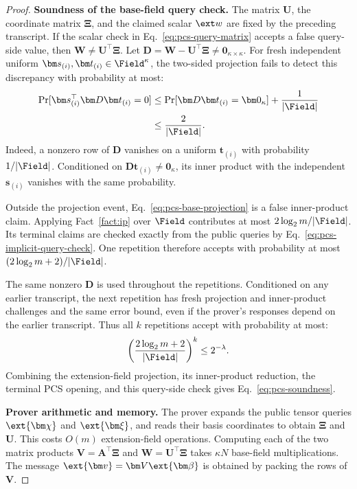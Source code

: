 \begin{proof}
\noindent\textbf{Soundness of the base-field query check.}
The matrix \(\bm U\), the coordinate matrix \(\bm\Xi\), and the
claimed scalar \(\ext w\) are fixed by the preceding transcript.
If the scalar check in Eq.~\eqref{eq:pcs-query-matrix} accepts a
false query-side value, then
\(\bm W\neq\bm U^\top\bm\Xi\).
Let
\(\bm D=\bm W-\bm U^\top\bm\Xi\neq\bm0_{\kappa\times\kappa}\).
For fresh independent uniform
\(\bm s_{(i)},\bm t_{(i)}\in\Field^\kappa\), the two-sided
projection fails to detect this discrepancy with probability at most:
\[
\begin{aligned}
    \Pr[\bm s_{(i)}^\top\bm D\bm t_{(i)}=0]
    &\leq
       \Pr[\bm D\bm t_{(i)}=\bm0_\kappa]
       +\frac{1}{|\Field|}\\
    &\leq\frac{2}{|\Field|}.
\end{aligned}
\]
Indeed, a nonzero row of \(\bm D\) vanishes on a uniform
\(\bm t_{(i)}\) with probability \(1/|\Field|\).
Conditioned on \(\bm D\bm t_{(i)}\neq\bm0_\kappa\), its inner
product with the independent \(\bm s_{(i)}\) vanishes with the
same probability.

Outside the projection event,
Eq.~\eqref{eq:pcs-base-projection} is a false inner-product claim.
Applying Fact~\ref{fact:ip} over \(\Field\) contributes at most
\(2\log_2m/|\Field|\).
Its terminal claims are checked exactly from the public queries by
Eq.~\eqref{eq:pcs-implicit-query-check}.
One repetition therefore accepts with probability at most
\((2\log_2m+2)/|\Field|\).

The same nonzero \(\bm D\) is used throughout the repetitions.
Conditioned on any earlier transcript, the next repetition has fresh
projection and inner-product challenges and the same error bound,
even if the prover's responses depend on the earlier transcript.
Thus all \(k\) repetitions accept with probability at most:
\[
    \left(\frac{2\log_2m+2}{|\Field|}\right)^k
    \leq2^{-\lambda}.
\]
Combining the extension-field projection, its inner-product reduction,
the terminal PCS opening, and this query-side check gives
Eq.~\eqref{eq:pcs-soundness}.

\noindent\textbf{Prover arithmetic and memory.}
The prover expands the public tensor queries
\(\ext{\bm\chi}\) and \(\ext{\bm\xi}\), and reads their basis
coordinates to obtain \(\bm\Xi\) and \(\bm U\).
This costs \(O(m)\) extension-field operations.
Computing each of the two matrix products
\(\bm V=\bm A^\top\bm\Xi\) and
\(\bm W=\bm U^\top\bm\Xi\) takes \(\kappa N\) base-field
multiplications.
The message \(\ext{\bm v}=\bm V\ext{\bm\beta}\) is obtained by
packing the rows of \(\bm V\).


\end{proof}
